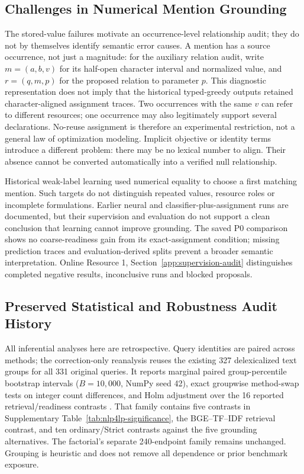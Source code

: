 \subsection{Challenges in Numerical Mention Grounding}
\label{app:occurrence-boundary}

The stored-value failures motivate an occurrence-level relationship audit; they do not by themselves identify semantic error causes. A mention has a source occurrence, not just a magnitude: for the auxiliary relation audit, write $m=(a,b,v)$ for its half-open character interval and normalized value, and $r=(q,m,p)$ for the proposed relation to parameter $p$. This diagnostic representation does not imply that the historical typed-greedy outputs retained character-aligned assignment traces. Two occurrences with the same $v$ can refer to different resources; one occurrence may also legitimately support several declarations. No-reuse assignment is therefore an experimental restriction, not a general law of optimization modeling. Implicit objective or identity terms introduce a different problem: there may be no lexical number to align. Their absence cannot be converted automatically into a verified null relationship.

Historical weak-label learning used numerical equality to choose a first matching mention. Such targets do not distinguish repeated values, resource roles or incomplete formulations. Earlier neural and classifier-plus-assignment runs are documented, but their supervision and evaluation do not support a clean conclusion that learning cannot improve grounding. The saved P0 comparison shows no coarse-readiness gain from its exact-assignment condition; missing prediction traces and evaluation-derived splits prevent a broader semantic interpretation. Online Resource 1, Section~\ref{app:supervision-audit} distinguishes completed negative results, inconclusive runs and blocked proposals.


\subsection{Preserved Statistical and Robustness Audit History}
\label{app:statistical-history}

All inferential analyses here are retrospective. Query identities are paired across methods; the correction-only reanalysis reuses the existing 327 delexicalized text groups for all 331 original queries. It reports marginal paired group-percentile bootstrap intervals ($B=10{,}000$, NumPy seed 42), exact groupwise method-swap tests on integer count differences, and Holm adjustment over the 16 reported retrieval/readiness contrasts \cite{holm1979followup}. That family contains five contrasts in Supplementary Table~\ref{tab:nlp4lp-significance}, the BGE--TF--IDF retrieval contrast, and ten ordinary/Strict contrasts against the five grounding alternatives. The factorial's separate 240-endpoint family remains unchanged. Grouping is heuristic and does not remove all dependence or prior benchmark exposure.

